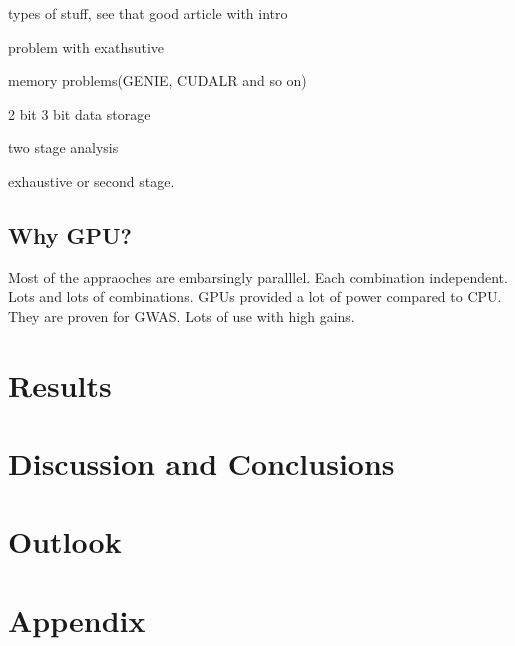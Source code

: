 \documentclass[10pt,a4paper]{article}
\begin{document}

types of stuff, see that good article with intro

problem with exathsutive

memory problems(GENIE, CUDALR and so on)

2 bit 3 bit data storage

two stage analysis

exhaustive or second stage.

\subsection{Why GPU?}
Most of the appraoches are embarsingly paralllel. Each combination independent. Lots and lots of combinations. GPUs provided a lot of power compared to CPU. They are proven for GWAS. Lots of use with high gains.

\section{Results}


\section{Discussion and Conclusions}


\section{Outlook}

\section{Appendix}


\newpage


\end{document}
